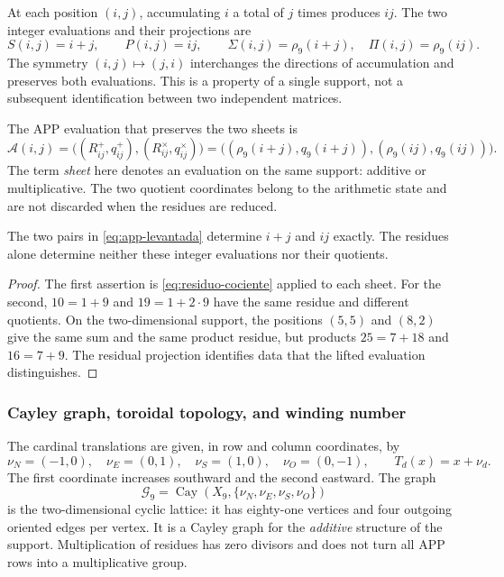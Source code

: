 At each position \((i,j)\), accumulating \(i\) a total of \(j\) times produces \(ij\). The two integer evaluations and their projections are
\[
 S(i,j)=i+j,\qquad P(i,j)=ij,\qquad
 \Sigma(i,j)=\rho_9(i+j),\quad \Pi(i,j)=\rho_9(ij).
\]
The symmetry \((i,j)\mapsto(j,i)\) interchanges the directions of accumulation and preserves both evaluations. This is a property of a single support, not a subsequent identification between two independent matrices.

\begin{definition}
The APP evaluation that preserves the two sheets is
\begin{equation}
 \mathcal A(i,j)=
 \bigl((R^+_{ij},q^+_{ij}),(R^\times_{ij},q^\times_{ij})\bigr)
 =\bigl((\rho_9(i+j),q_9(i+j)),(\rho_9(ij),q_9(ij))\bigr).
 \label{eq:app-levantada}
\end{equation}
The term \emph{sheet} here denotes an evaluation on the same support: additive or multiplicative. The two quotient coordinates belong to the arithmetic state and are not discarded when the residues are reduced.
\end{definition}



\begin{proposition}
The two pairs in \eqref{eq:app-levantada} determine \(i+j\) and \(ij\) exactly. The residues alone determine neither these integer evaluations nor their quotients.
\end{proposition}
\begin{proof}
The first assertion is \eqref{eq:residuo-cociente} applied to each sheet. For the second, \(10=1+9\) and \(19=1+2\cdot9\) have the same residue and different quotients. On the two-dimensional support, the positions \((5,5)\) and \((8,2)\) give the same sum and the same product residue, but products \(25=7+18\) and \(16=7+9\). The residual projection identifies data that the lifted evaluation distinguishes.
\end{proof}

\subsubsection{Cayley graph, toroidal topology, and winding number}

The cardinal translations are given, in row and column coordinates, by
\[
 \nu_N=(-1,0),\quad\nu_E=(0,1),\quad
 \nu_S=(1,0),\quad\nu_O=(0,-1),\qquad T_d(x)=x+\nu_d.
\]
The first coordinate increases southward and the second eastward. The graph
\[
 \mathscr G_9=\operatorname{Cay}(X_9,\{\nu_N,\nu_E,\nu_S,\nu_O\})
\]
is the two-dimensional cyclic lattice: it has eighty-one vertices and four outgoing oriented edges per vertex. It is a Cayley graph for the \emph{additive} structure of the support. Multiplication of residues has zero divisors and does not turn all APP rows into a multiplicative group.


